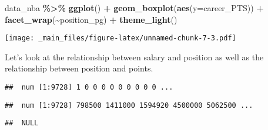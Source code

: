\documentclass[
]{book}
\newenvironment{Shaded}{\begin{snugshade}}{\end{snugshade}}
\newcommand{\AttributeTok}[1]{\textcolor[rgb]{0.13,0.29,0.53}{#1}}
\newcommand{\FunctionTok}[1]{\textcolor[rgb]{0.13,0.29,0.53}{\textbf{#1}}}
\newcommand{\NormalTok}[1]{#1}
\newcommand{\SpecialCharTok}[1]{\textcolor[rgb]{0.81,0.36,0.00}{\textbf{#1}}}
\begin{document}
\begin{Shaded}
\begin{Highlighting}[]
\NormalTok{data\_nba }\SpecialCharTok{\%\textgreater{}\%} \FunctionTok{ggplot}\NormalTok{() }\SpecialCharTok{+} 
\FunctionTok{geom\_boxplot}\NormalTok{(}\FunctionTok{aes}\NormalTok{(}\AttributeTok{y=}\NormalTok{career\_PTS)) }\SpecialCharTok{+}
  \FunctionTok{facet\_wrap}\NormalTok{(}\SpecialCharTok{\textasciitilde{}}\NormalTok{position\_pg) }\SpecialCharTok{+}
  \FunctionTok{theme\_light}\NormalTok{()}
\end{Highlighting}
\end{Shaded}

\texttt{[image: \_main\_files/figure-latex/unnamed-chunk-7-3.pdf]}

Let's look at the relationship between salary and position as well as the
relationship between position and points.

\begin{Shaded}
\end{Shaded}

\begin{verbatim}
##  num [1:9728] 1 0 0 0 0 0 0 0 0 0 ...
\end{verbatim}

\begin{Shaded}
\end{Shaded}

\begin{verbatim}
##  num [1:9728] 798500 1411000 1594920 4500000 5062500 ...
\end{verbatim}

\begin{Shaded}
\end{Shaded}

\begin{verbatim}
##  NULL
\end{verbatim}
\end{document}
